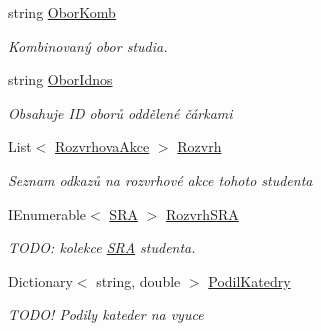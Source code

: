 \begin{DoxyCompactItemize}
string \hyperlink{class_analyza_rozvrhu_1_1_s_t_a_g___classes_1_1_student_aa9e2fa1a0f829288ab4ae30f5724408f}{Obor\+Komb}
\begin{DoxyCompactList}\small\item\em Kombinovaný obor studia. \end{DoxyCompactList}\item 
string \hyperlink{class_analyza_rozvrhu_1_1_s_t_a_g___classes_1_1_student_a01c89f49ea857849232732856f99c8e3}{Obor\+Idnos}
\begin{DoxyCompactList}\small\item\em Obsahuje ID oborů oddělené čárkami \end{DoxyCompactList}\item 
List$<$ \hyperlink{class_analyza_rozvrhu_1_1_s_t_a_g___classes_1_1_rozvrhova_akce}{Rozvrhova\+Akce} $>$ \hyperlink{class_analyza_rozvrhu_1_1_s_t_a_g___classes_1_1_student_a1a798f83334db8e22341cbf2bb638170}{Rozvrh}
\begin{DoxyCompactList}\small\item\em Seznam odkazů na rozvrhové akce tohoto studenta \end{DoxyCompactList}\item 
I\+Enumerable$<$ \hyperlink{class_analyza_rozvrhu_1_1_s_t_a_g___classes_1_1_s_r_a}{S\+RA} $>$ \hyperlink{class_analyza_rozvrhu_1_1_s_t_a_g___classes_1_1_student_ad93dc66f6e249d2772d889998c456e1b}{Rozvrh\+S\+RA}
\begin{DoxyCompactList}\small\item\em T\+O\+DO\+: kolekce \hyperlink{class_analyza_rozvrhu_1_1_s_t_a_g___classes_1_1_s_r_a}{S\+RA} studenta. \end{DoxyCompactList}\item 
Dictionary$<$ string, double $>$ \hyperlink{class_analyza_rozvrhu_1_1_s_t_a_g___classes_1_1_student_aa41bbcf1b0702c4229bbfd61db638a53}{Podil\+Katedry}
\begin{DoxyCompactList}\small\item\em T\+O\+D\+O! Podily kateder na vyuce \end{DoxyCompactList}\end{DoxyCompactItemize}


